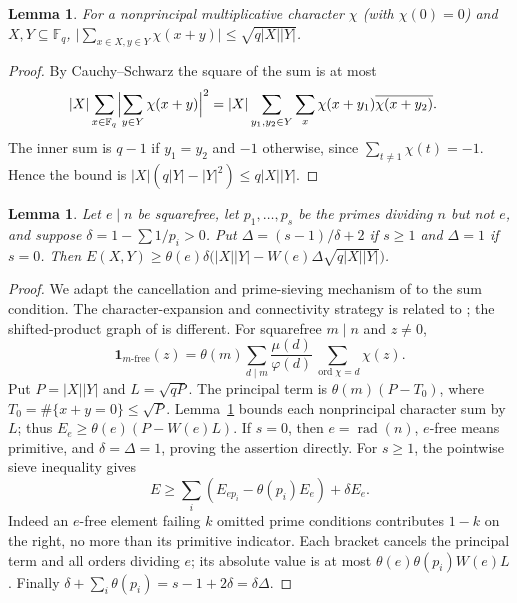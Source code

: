 \documentclass[11pt]{amsart}
\newtheorem{lemma}[theorem]{Lemma}
\newcommand{\F}{\mathbb{F}}
\begin{document}
\begin{lemma}\label{lem:char}
For a nonprincipal multiplicative character $\chi$ (with $\chi(0)=0$) and $X,Y\subseteq\F_q$, $\bigl|\sum_{x\in X,y\in Y}\chi(x+y)\bigr|\le\sqrt{q|X||Y|}$.
\end{lemma}
\begin{proof}
By Cauchy--Schwarz the square of the sum is at most
\[
\begin{aligned}
|X|\sum_{x\in\F_q}\Bigl|\sum_{y\in Y}\chi(x+y)\Bigr|^2
&=|X|\sum_{y_1,y_2\in Y}\sum_x
\chi(x+y_1)\overline{\chi(x+y_2)}.
\end{aligned}
\]
The inner sum is $q-1$ if $y_1=y_2$ and $-1$ otherwise, since
$\sum_{t\ne1}\chi(t)=-1$. Hence the bound is
$|X|(q|Y|-|Y|^2)\le q|X||Y|$.
\end{proof}

\begin{lemma}\label{lem:sieve}
Let $e\mid n$ be squarefree, let $p_1,\dots,p_s$ be the primes dividing $n$ but not $e$, and suppose $\delta=1-\sum 1/p_i>0$. Put $\Delta=(s-1)/\delta+2$ if $s\ge1$ and $\Delta=1$ if $s=0$. Then $E(X,Y)\ge\theta(e)\delta\bigl(|X||Y|-W(e)\Delta\sqrt{q|X||Y|}\bigr)$.
\end{lemma}
\begin{proof}
We adapt the cancellation and prime-sieving mechanism of \cite[Lemmas 4--5]{COT}
to the sum condition. The character-expansion and connectivity strategy is
related to \cite{She,LS}; the shifted-product graph of \cite{LS} is different.
For squarefree $m\mid n$ and $z\ne0$,
\[
\mathbf1_{m\text{-free}}(z)=\theta(m)\sum_{d\mid m}
\frac{\mu(d)}{\varphi(d)}\sum_{\operatorname{ord}\chi=d}\chi(z).
\]
Put $P=|X||Y|$ and $L=\sqrt{qP}$. The principal term is
$\theta(m)(P-T_0)$, where $T_0=\#\{x+y=0\}\le\sqrt P$.
Lemma~\ref{lem:char} bounds each nonprincipal character sum by $L$;
thus $E_e\ge\theta(e)(P-W(e)L)$.
If $s=0$, then $e=\operatorname{rad}(n)$, $e$-free means primitive,
and $\delta=\Delta=1$, proving the assertion directly.
For $s\ge1$, the pointwise sieve inequality gives
\[
E\ge\sum_i(E_{ep_i}-\theta(p_i)E_e)+\delta E_e.
\]
Indeed an $e$-free element failing $k$ omitted prime conditions contributes
$1-k$ on the right, no more than its primitive indicator.
Each bracket cancels the principal term and all orders dividing $e$;
its absolute value is at most $\theta(e)\theta(p_i)W(e)L$.
Finally $\delta+\sum_i\theta(p_i)=s-1+2\delta=\delta\Delta$.
\end{proof}
\end{document}
